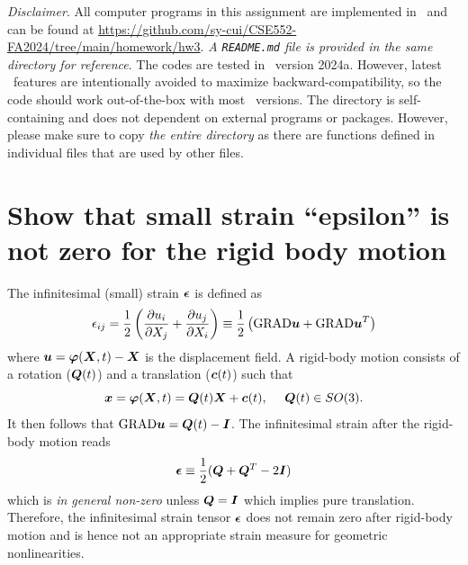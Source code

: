 \pagestyle{fancy}
\setlength{\headheight}{16pt}
\fancyhead{} %
\fancyfoot{} %
\fancyfoot[C]{\thepage}

\newcommand{\Fint}{\ensuremath{\bv{F}^{\textrm{int}}}}
\newcommand{\Fext}{\ensuremath{\bv{F}^{\textrm{ext}}}}

\noindent \emph{Disclaimer}. All computer programs in this assignment are implemented in \matlab~and can be found at \url{https://github.com/sy-cui/CSE552-FA2024/tree/main/homework/hw3}. 
\emph{A \texttt{README.md} file is provided in the same directory for reference}. 
The codes are tested in \matlab~version 2024a. 
However, latest \matlab~features are intentionally avoided to maximize backward-compatibility, so the code should work out-of-the-box with most \matlab~versions. 
The directory is self-containing and does not dependent on external programs or packages. 
However, please make sure to copy \emph{the entire directory} as there are functions defined in individual files that are used by other files. 

\section{Show that small strain ``epsilon'' is not zero for the rigid body motion}
The infinitesimal (small) strain $\bm{\epsilon}$ is defined as 
\begin{equation}
    \epsilon_{ij} = \frac{1}{2}\left(\frac{\partial u_i}{\partial X_j} + \frac{\partial u_j}{\partial X_i}\right) \equiv \frac{1}{2}\left(\textrm{GRAD} \bm{u} + \textrm{GRAD} \bm{u}^T\right)
\end{equation}
where $\bm{u} = \bm{\varphi}(\bm{X}, t) - \bm{X}$ is the displacement field.
A rigid-body motion consists of a rotation ($\bm{Q}(t)$) and a translation ($\bm{c}(t)$) such that 
\begin{equation}\label{eqn:hw3_p1_rigid}
    \bm{x} = \bm{\varphi}(\bm{X}, t) = \bm{Q}(t) \bm{X} + \bm{c}(t), ~~~~ \bm{Q}(t)\in SO(3).
\end{equation}
It then follows that $\textrm{GRAD}\bm{u} = \bm{Q}(t) - \bm{I}$. 
The infinitesimal strain after the rigid-body motion reads
\begin{equation}
    \bm{\epsilon} \equiv \frac{1}{2}(\bm{Q} + \bm{Q}^T - 2\bm{I})
\end{equation}
which is \emph{in general non-zero} unless $\bm{Q} = \bm{I}$ which implies pure translation.
Therefore, the infinitesimal strain tensor $\bm{\epsilon}$ does not remain zero after rigid-body motion and is hence not an appropriate strain measure for geometric nonlinearities. 

